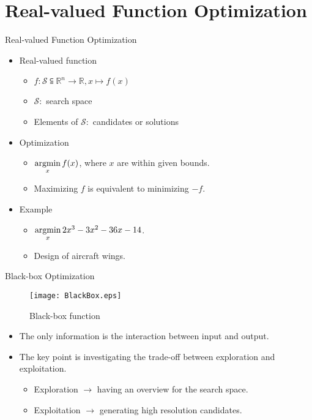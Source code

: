 \newcommand{\argmin}{\operatornamewithlimits{argmin}}

\section{Real-valued Function Optimization}

\begin{frame}{Real-valued Function Optimization}
  \begin{itemize}
    \item{Real-valued function}
      \begin{itemize}
        \item $f \colon \mathcal{S} \subseteqq \mathbb{R}^n \to
          \mathbb{R},x \mapsto f(x)$
        \item $\mathcal{S} \colon $ search space
        \item Elements of $\mathcal{S} \colon $ candidates or solutions
      \end{itemize}
    \item{Optimization}
      \begin{itemize}
        \item $\argmin\limits_{x} f(x)$, where $x$ are within given bounds.
        \item Maximizing $f$ is equivalent to minimizing $-f$.
      \end{itemize}
    \item Example
      \begin{itemize}
        \item $\argmin\limits_x 2x^3-3x^2-36x-14$.
        \item Design of aircraft wings.
      \end{itemize}
  \end{itemize}
\end{frame}

\begin{frame}{Black-box Optimization}

  \begin{figure}[h]
    \texttt{[image: BlackBox.eps]}
    \caption{Black-box function}  
  \end{figure}
  \begin{itemize}
    \item The only information is the interaction between input and
    output.  
  \item The key point is investigating the trade-off between
    \alert{exploration}
    and \alert{exploitation}.
    \begin{itemize}
      \item Exploration $\rightarrow$ having an overview for the search
        space.
  \item Exploitation $\rightarrow$ generating high resolution
    candidates. 
    \end{itemize}
  \end{itemize}

\end{frame}

